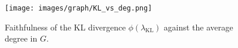 \documentclass{article}
\begin{document}


\begin{figure}[h]
    \centering
    \texttt{[image: images/graph/KL\_vs\_deg.png]}
    \caption{Faithfulness of the KL divergence $\phi(\lambda_{\mathrm{KL}})$ against the average degree in $G$.}
    \label{fig:tradeoff}
\end{figure}
\end{document}
